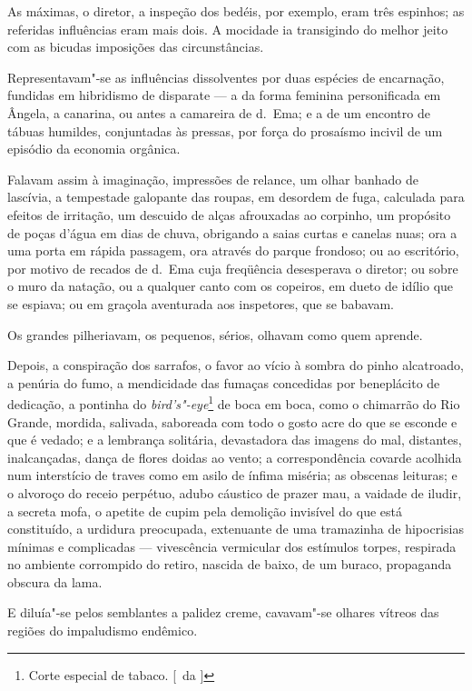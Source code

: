 As máximas, o diretor, a inspeção dos
bedéis, por exemplo, eram três espinhos; as referidas influências eram
mais dois. A mocidade ia transigindo do melhor jeito com as bicudas
imposições das circunstâncias. 

Representavam"-se as influências
dissolventes por duas espécies de encarnação, fundidas em hibridismo de
disparate --- a da forma feminina personificada em Ângela, a canarina,
ou antes a camareira de d.~Ema; e a de um encontro de tábuas humildes,
conjuntadas às pressas, por força do prosaísmo incivil de um episódio
da economia orgânica. 

Falavam assim à imaginação, impressões de
relance, um olhar banhado de lascívia, a tempestade galopante das
roupas, em desordem de fuga, calculada para efeitos de irritação, um
descuido de alças afrouxadas ao corpinho, um propósito de poças d'água
em dias de chuva, obrigando a saias curtas e canelas nuas; ora a uma
porta em rápida passagem, ora através do parque frondoso; ou ao
escritório, por motivo de recados de d.~Ema cuja freqüência desesperava o diretor;
ou sobre o muro da natação, ou a qualquer canto com os copeiros, em
dueto de idílio que se espiava; ou em graçola aventurada aos
inspetores, que se babavam. 

Os grandes pilheriavam, os pequenos,
sérios, olhavam como quem aprende. 

Depois, a conspiração dos sarrafos,
o favor ao vício à sombra do pinho alcatroado, a penúria do fumo, a
mendicidade das fumaças concedidas por beneplácito de dedicação, a
pontinha do \textit{bird's"-eye}\footnote{ Corte especial de tabaco. [~da ]} 
de boca em boca, como o chimarrão do Rio
Grande, mordida, salivada, saboreada com todo o gosto acre do que se
esconde e que é vedado; e a lembrança solitária, devastadora das
imagens do mal, distantes, inalcançadas, dança de flores doidas ao
vento; a correspondência covarde acolhida num interstício de traves
como em asilo de ínfima miséria; as obscenas leituras; e o alvoroço do
receio perpétuo, adubo cáustico de prazer mau, a vaidade de iludir, a
secreta mofa, o apetite de cupim pela demolição invisível do que está
constituído, a urdidura preocupada, extenuante de uma tramazinha de
hipocrisias mínimas e complicadas --- vivescência vermicular dos
estímulos torpes, respirada no ambiente corrompido do retiro, nascida
de baixo, de um buraco, propaganda obscura da lama. 

E diluía"-se pelos semblantes a palidez creme, cavavam"-se 
olhares vítreos das regiões do impaludismo endêmico. 

